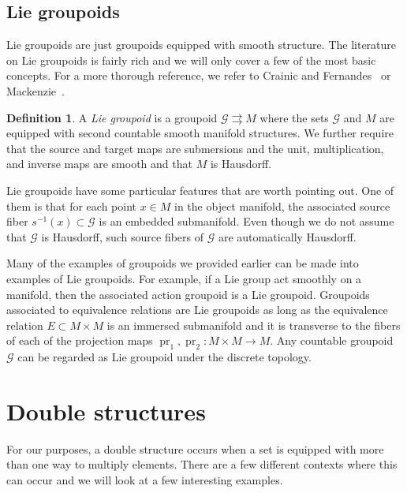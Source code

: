 \documentclass[10pt,a4paper]{amsart}
\numberwithin{equation}{section}
\theoremstyle{definition}
\newtheorem{Definition}[Theorem]{Definition}
\newcommand{\CG}{\mathcal{G}}
\newcommand{\inv}{^{-1}}
\newcommand{\grpd}{\rightrightarrows}
\DeclareMathOperator{\pr}{pr}
\begin{document}
\subsection{Lie groupoids}
Lie groupoids are just groupoids equipped with smooth structure. The literature on Lie group\-oids is fairly rich and we will only cover a few of the most basic concepts. For a more thorough reference, we refer to Crainic and Fernandes~\cite{LectOnInt} or Mackenzie~\cite{MackenzieGeneralTheory}.
\begin{Definition}
  A \emph{Lie groupoid} is a groupoid $ \CG \grpd M $ where the sets $ \CG $ and $ M $ are equipped with second countable smooth manifold structures.
  We further require that the source and target maps are submersions and the unit, multiplication, and inverse maps are smooth and that $ M $ is Hausdorff.
\end{Definition}
Lie groupoids have some particular features that are worth pointing out. One of them is that for each point $ x \in M $ in the object manifold, the associated source fiber $ s\inv(x) \subset \CG$ is an embedded submanifold. Even though we do not assume that $ \CG $ is Hausdorff, such source fibers of $ \CG $ are automatically Hausdorff.

Many of the examples of groupoids we provided earlier can be made into examples of Lie groupoids. For example, if a Lie group act smoothly on a manifold, then the associated action groupoid is a Lie groupoid. Groupoids associated to equivalence relations are Lie groupoids as long as the equivalence relation $ E \subset M \times M $ is an immersed submanifold and it is transverse to the fibers of each of the projection maps $ \pr_1, \pr_2 \colon M \times M \to M $. Any countable groupoid $ \CG $ can be regarded as Lie groupoid under the discrete topology.

\section{Double structures}
For our purposes, a double structure occurs when a set is equipped with more than one way to multiply elements. There are a few different contexts where this can occur and we will look at a few interesting examples.
\end{document}
